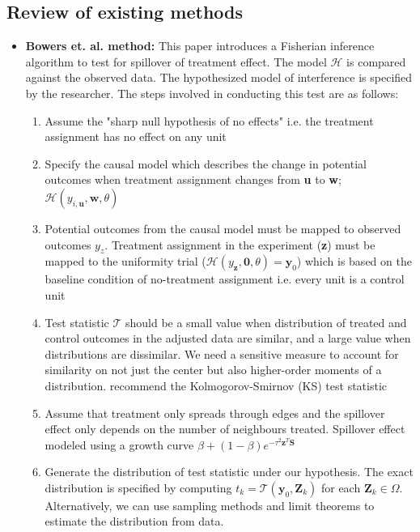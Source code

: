 \documentclass[12pt]{article}
\begin{document}
\subsection{Review of existing methods}
\begin{itemize}
\item {\bf Bowers et. al. method:} This paper introduces a Fisherian inference algorithm to test for spillover of treatment effect. The model $\mathcal{H}$ is compared against the observed data. The hypothesized model of interference is specified by the researcher. The steps involved in conducting this test are as follows:

\begin{enumerate}

\item Assume the "sharp null hypothesis of no effects" i.e. the treatment assignment has no effect on any unit

\item Specify the causal model which describes the change in potential outcomes when treatment assignment changes from \textbf{u} to \textbf{w}; $\mathcal{H}(y_{i, \textbf{u}}, \textbf{w}, \theta)$

\item Potential outcomes from the causal model must be mapped to observed outcomes $y_z$. Treatment assignment in the experiment (\textbf{z}) must be mapped to the uniformity trial ($\mathcal{H}(y_{\textbf{z}}, \textbf{0}, \theta) = \textbf{y}_0$) which is based on the baseline condition of no-treatment assignment i.e. every unit is a control unit

\item Test statistic $\mathcal{T}$ should be a small value when distribution of treated and control outcomes in the adjusted data are similar, and a large value when distributions are dissimilar. We need a sensitive measure to account for similarity on not just the center but also higher-order moments of a distribution. \citet{bowers2012reasoning} recommend the Kolmogorov-Smirnov (KS) test statistic

\item Assume that treatment only spreads through edges and the spillover effect only depends on the number of neighbours treated. Spillover effect modeled using a growth curve $\beta + (1-\beta)e^{-\tau^2\textbf{z}^T\textbf{S}}$

\item Generate the distribution of test statistic under our hypothesis. The exact distribution is specified by computing $t_k = \mathcal{T} (\textbf{y}_0, \textbf{Z}_k)$ for each $\textbf{Z}_k \in \Omega$. Alternatively, we can use sampling methods and limit theorems to estimate the distribution from data.


\end{enumerate}
\end{itemize}
\end{document}
